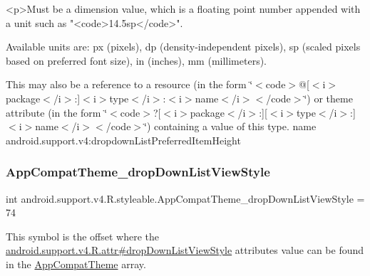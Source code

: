 \begin{DoxyVerb}      <p>Must be a dimension value, which is a floating point number appended with a unit such as "<code>14.5sp</code>".
\end{DoxyVerb}
 Available units are\+: px (pixels), dp (density-\/independent pixels), sp (scaled pixels based on preferred font size), in (inches), mm (millimeters). 

This may also be a reference to a resource (in the form \char`\"{}$<$code$>$@\mbox{[}$<$i$>$package$<$/i$>$\+:\mbox{]}$<$i$>$type$<$/i$>$\+:$<$i$>$name$<$/i$>$$<$/code$>$\char`\"{}) or theme attribute (in the form \char`\"{}$<$code$>$?\mbox{[}$<$i$>$package$<$/i$>$\+:\mbox{]}\mbox{[}$<$i$>$type$<$/i$>$\+:\mbox{]}$<$i$>$name$<$/i$>$$<$/code$>$\char`\"{}) containing a value of this type.  name android.\+support.\+v4\+:dropdown\+List\+Preferred\+Item\+Height \mbox{\label{classandroid_1_1support_1_1v4_1_1R_1_1styleable_a0da4ef3e81a5ae109c029dd45167387f}} 
\subsubsection{\texorpdfstring{App\+Compat\+Theme\+\_\+drop\+Down\+List\+View\+Style}{AppCompatTheme\_dropDownListViewStyle}}
{\footnotesize\ttfamily int android.\+support.\+v4.\+R.\+styleable.\+App\+Compat\+Theme\+\_\+drop\+Down\+List\+View\+Style = 74\hspace{0.3cm}{\ttfamily [static]}}

This symbol is the offset where the \hyperlink{classandroid_1_1support_1_1v4_1_1R_1_1attr_a2b5afda32e7bb835a1f0d4c087801418}{android.\+support.\+v4.\+R.\+attr\#drop\+Down\+List\+View\+Style} attribute\textquotesingle{}s value can be found in the \hyperlink{classandroid_1_1support_1_1v4_1_1R_1_1styleable_ac07ebbe62ed977f6dcaadc6397840ace}{App\+Compat\+Theme} array.

